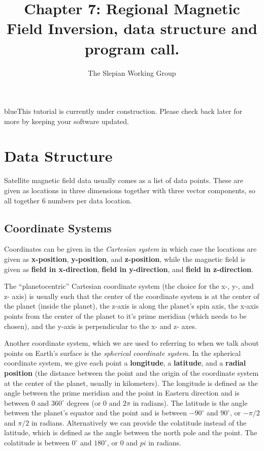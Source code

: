 \documentclass[11pt]{article}
\title{Chapter 7: Regional Magnetic Field Inversion, data structure
  and program call.}
\author{The Slepian Working Group}
\newcommand{\TAG}{\begin{color}{blue}This tutorial is currently under
    construction. Please check back later for more by keeping your
    software updated.\end{color}}
\begin{document}
\maketitle

\TAG

\section{Data Structure}

Satellite magnetic field data usually comes as a list of data
points. These are given as locations in three dimensions together with
three vector components, so all together 6 numbers per data location.

\subsection{Coordinate Systems}

Coordinates can be given in the \emph{Cartesian system} in which case
the locations are given as \textbf{x-position}, \textbf{y-position},
and \textbf{z-position}, while the magnetic field is given as
\textbf{field in x-direction}, \textbf{field in y-direction}, and
\textbf{field in z-direction}.


The ``planetocentric'' Cartesian coordinate system (the choice for the
x-, y-, and z- axis) is usually such that the center of the coordinate
system is at the center of the planet (inside the planet), the z-axis
is along the planet's spin axis, the x-axis points from the center of
the planet to it's prime meridian (which needs to be chosen), and the
y-axis is perpendicular to the x- and z- axes.

Another coordinate system, which we are used to referring to when we
talk about points on Earth's surface is the \emph{spherical coordinate
  system}. In the spherical coordinate system, we give each point a
\textbf{longitude}, a \textbf{latitude}, and a \textbf{radial
  position} (the distance between the point and the origin of the
coordinate system at the center of the planet, usually in
kilometers). The longitude is defined as the angle between the prime
meridian and the point in Eastern direction and is between 0 and
$360^\circ$ degrees (or 0 and $2\pi$ in radians). The latitude is the
angle between the planet's equator and the point and is between
$-90^\circ$ and $90^\circ$, or $-\pi/2$ and $\pi/2$ in
radians. Alternatively we can provide the colatitude instead of the
latitude, which is defined as the angle between the north pole and the
point. The colatitude is between $0^\circ$ and $180^\circ$, or $0$ and
$pi$ in radians.
\end{document}
